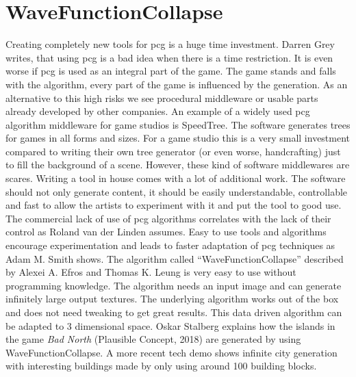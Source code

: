 \documentclass[10pt,a4paper]{article}
\begin{document}
\section{WaveFunctionCollapse}\label{sec:WaveFunctionCollapse}
\begin{multicols}{2}
Creating completely new tools for \gls{pcg} is a huge time investment. Darren Grey writes, that using \gls{pcg} is a bad idea when there is a time restriction\citep[p.~6]{Short:2017:PGG:3161477}. It is even worse if \gls{pcg} is used as an integral part of the game. The game stands and falls with the algorithm, every part of the game is influenced by the generation. As an alternative to this high risks we see procedural middleware or usable parts already developed by other companies. An example of a widely used \gls{pcg} algorithm middleware for game studios is SpeedTree\cite{SpeedTree}. The software generates trees for games in all forms and sizes. For a game studio this is a very small investment compared to writing their own tree generator (or even worse, handcrafting) just to fill the background of a scene. However, these kind of software middlewares are scares. Writing a tool in house comes with a lot of additional work. The software should not only generate content, it should be easily understandable, controllable and fast to allow the artists to experiment with it and put the tool to good use. The commercial lack of use of \gls{pcg} algorithms correlates with the lack of their control as Roland van der Linden assumes\cite{VanderLinden2014}. Easy to use tools and algorithms encourage experimentation and leads to faster adaptation of \gls{pcg} techniques as Adam M. Smith shows\cite{Karth2017}. The algorithm called “WaveFunctionCollapse” described by Alexei A. Efros and Thomas K. Leung is very easy to use without programming knowledge\cite{Efros1999}. The algorithm needs an input image and can generate infinitely large output textures. The underlying algorithm works out of the box and does not need tweaking to get great results. This data driven algorithm can be adapted to 3 dimensional space. Oskar Stalberg explains how the islands in the game \textit{Bad North} (Plausible Concept, 2018) are generated by using WaveFunctionCollapse. A more recent tech demo shows infinite city generation with interesting buildings made by only using around 100 building blocks\cite{Marian2019}.
\end{multicols}
\end{document}
